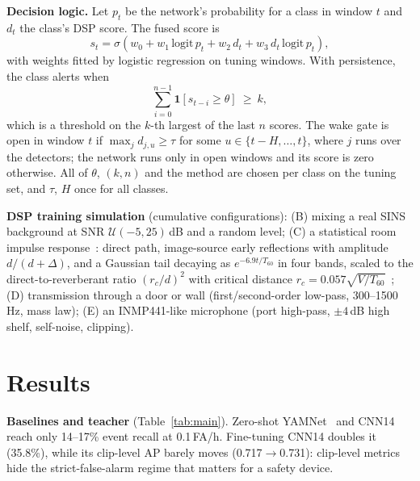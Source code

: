 \documentclass[conference]{IEEEtran}
\begin{document}
\textbf{Decision logic.} Let $p_t$ be the network's probability for a class in window $t$ and
$d_t$ the class's DSP score. The fused score is
\begin{equation}
s_t=\sigma\!\left(w_0+w_1\,\mathrm{logit}\,p_t+w_2\,d_t+w_3\,d_t\,\mathrm{logit}\,p_t\right),
\end{equation}
with weights fitted by logistic regression on tuning windows. With persistence, the class alerts
when
\begin{equation}
\sum_{i=0}^{n-1}\mathbf{1}\!\left[s_{t-i}\ge\theta\right]\ \ge\ k,
\end{equation}
which is a threshold on the $k$-th largest of the last $n$ scores. The wake gate is open in
window $t$ if $\max_j d_{j,u}\ge\tau$ for some $u\in\{t-H,\dots,t\}$, where $j$ runs over the
detectors; the network runs only in open windows and its score is zero otherwise. All of
$\theta$, $(k,n)$ and the method are chosen per class on the tuning set, and $\tau$, $H$ once
for all classes.

\textbf{DSP training simulation} (cumulative configurations): (B) mixing a real SINS background
at SNR $\mathcal{U}(-5,25)$\,dB and a random level; (C) a statistical room impulse
response~\cite{polack}: direct path, image-source early reflections with amplitude $d/(d+\Delta)$,
and a Gaussian tail decaying as $e^{-6.9t/T_{60}}$ in four bands, scaled to the
direct-to-reverberant ratio $(r_c/d)^2$ with critical distance $r_c=0.057\sqrt{V/T_{60}}$~\cite{kuttruff};
(D) transmission through a door or wall (first/second-order low-pass, 300--1500\,Hz, mass law);
(E) an INMP441-like microphone (port high-pass, $\pm4$\,dB high shelf, self-noise, clipping).

\section{Results}
\textbf{Baselines and teacher} (Table~\ref{tab:main}). Zero-shot YAMNet~\cite{yamnet} and CNN14
reach only 14--17\% event recall at 0.1\,FA/h. Fine-tuning CNN14 doubles it (35.8\%), while its
clip-level AP barely moves (0.717$\to$0.731): clip-level metrics hide the strict-false-alarm
regime that matters for a safety device.
\end{document}
